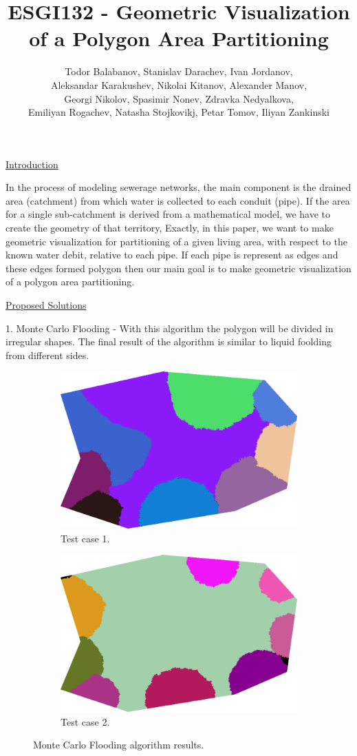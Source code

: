 \documentclass{article}
\title{ESGI132 - Geometric Visualization of a Polygon Area Partitioning}
\author{Todor Balabanov, Stanislav Darachev, Ivan Jordanov,\\
Aleksandar Karakushev, Nikolai Kitanov, Alexander Manov,\\
Georgi Nikolov, Spasimir Nonev, Zdravka Nedyalkova,\\
Emiliyan Rogachev, Natasha Stojkovikj, Petar Tomov, Iliyan Zankinski}
\begin{document}
%
\maketitle

\underline{Introduction}
\vspace*{3mm}

In the process of modeling sewerage networks, the main component is the drained area (catchment) from which water is collected to each conduit (pipe). If the area for a single sub-catchment is derived from a mathematical model, we have to create the geometry of that territory, Exactly, in this paper, we want to make geometric visualization for partitioning of a given living area, with respect to the known water debit, relative to each pipe. If each pipe is represent as edges and these edges formed polygon  then our main goal is to make geometric visualization of a polygon area partitioning.
\vspace*{3mm}

\underline{Proposed Solutions}
\vspace*{3mm}

1. Monte Carlo Flooding - With this algorithm the polygon will be divided in irregular shapes. The final result of the algorithm is similar to liquid foolding from different sides.
\begin{figure}[h!]
\centering
\begin{subfigure}{.5\textwidth}
  \centering
  \includegraphics[width=.5\linewidth]{pic08.png}
  \caption{Test case 1.}
  \label{fig:sub7}
\end{subfigure}%
\begin{subfigure}{.5\textwidth}
  \centering
  \includegraphics[width=.5\linewidth]{pic09.png}
  \caption{Test case 2.}
  \label{fig:sub8}
\end{subfigure}
\caption{Monte Carlo Flooding algorithm results.}
\label{fig:five}
\end{figure}
\end{document}
